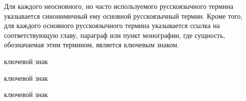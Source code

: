 \bigskip

Для каждого неосновного, но часто используемого русскоязычного термина указывается синонимичный ему основной русскоязычный термин. Кроме того, для каждого основного русскоязычного термина указывается ссылка на соответствующую главу, параграф или пункт монографии, где сущность, обозначаемая этим термином, является ключевым знаком.

\bigskip

\begin{SCn}

\begin{scnreltolist}{ключевой знак}
\end{scnreltolist}

\begin{scnreltolist}{ключевой знак}
\end{scnreltolist}	

\bigskip
\bigskip
\bigskip
	
\begin{scnreltolist}{ключевой знак}
\end{scnreltolist}

\end{SCn}	